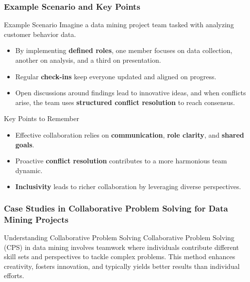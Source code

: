 \documentclass{beamer}
\begin{document}
\begin{frame}[fragile]
    \frametitle{Example Scenario and Key Points}
    \begin{block}{Example Scenario}
        Imagine a data mining project team tasked with analyzing customer behavior data. 
        \begin{itemize}
            \item By implementing \textbf{defined roles}, one member focuses on data collection, another on analysis, and a third on presentation.
            \item Regular \textbf{check-ins} keep everyone updated and aligned on progress.
            \item Open discussions around findings lead to innovative ideas, and when conflicts arise, the team uses \textbf{structured conflict resolution} to reach consensus.
        \end{itemize}
    \end{block}

    \begin{block}{Key Points to Remember}
        \begin{itemize}
            \item Effective collaboration relies on \textbf{communication}, \textbf{role clarity}, and \textbf{shared goals}.
            \item Proactive \textbf{conflict resolution} contributes to a more harmonious team dynamic.
            \item \textbf{Inclusivity} leads to richer collaboration by leveraging diverse perspectives.
        \end{itemize}
    \end{block}
\end{frame}

\begin{frame}[fragile]
    \frametitle{Case Studies in Collaborative Problem Solving for Data Mining Projects}
    \begin{block}{Understanding Collaborative Problem Solving}
        Collaborative Problem Solving (CPS) in data mining involves teamwork where individuals contribute different skill sets and perspectives to tackle complex problems. This method enhances creativity, fosters innovation, and typically yields better results than individual efforts.
    \end{block}
\end{frame}
\end{document}

